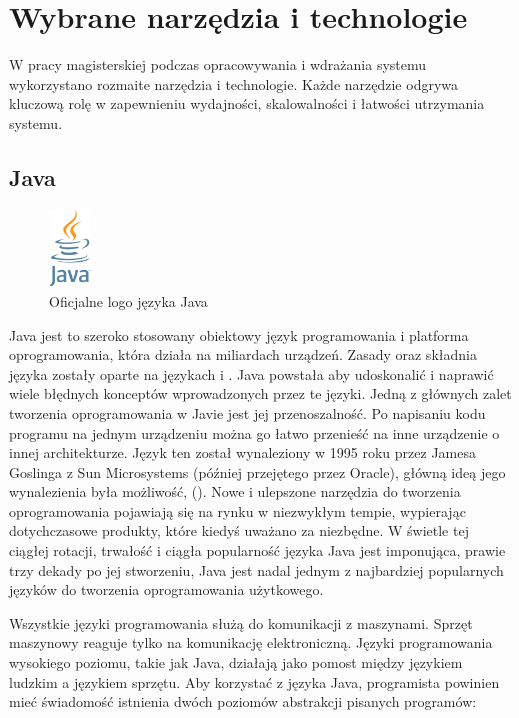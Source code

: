 \chapter{Wybrane narzędzia i technologie}


W pracy magisterskiej podczas opracowywania i wdrażania systemu wykorzystano rozmaite narzędzia i technologie. Każde narzędzie odgrywa kluczową rolę w zapewnieniu wydajności, skalowalności i łatwości utrzymania systemu.

\section{Java}

\begin{figure}[!htbp]
    \centering
    \includegraphics[width=0.1\textwidth]{images/javaLogo.png}
    \caption{Oficjalne logo języka Java}
    \label{fig:enter-label}
\end{figure}

Java jest to szeroko stosowany obiektowy język programowania i platforma oprogramowania, która działa na miliardach urządzeń. Zasady oraz składnia języka zostały oparte na językach  i \cite{javaIBM}\cite{cstandard}\cite{cppstandard}. Java powstała aby udoskonalić i naprawić wiele błędnych konceptów wprowadzonych przez te języki. Jedną z głównych zalet tworzenia oprogramowania w Javie jest jej przenoszalność. Po napisaniu kodu programu na jednym urządzeniu można go łatwo przenieść na inne urządzenie o innej architekturze. Język ten został wynaleziony w 1995 roku przez Jamesa Goslinga z Sun Microsystems (później przejętego przez Oracle), główną ideą jego wynalezienia była możliwość,   (). Nowe i ulepszone narzędzia do tworzenia oprogramowania pojawiają się na rynku w niezwykłym tempie, wypierając dotychczasowe produkty, które kiedyś uważano za niezbędne. W świetle tej ciągłej rotacji, trwałość i ciągła popularność języka Java jest imponująca, prawie trzy dekady po jej stworzeniu, Java jest nadal jednym z najbardziej popularnych języków do tworzenia oprogramowania użytkowego\cite{javaIBM}\cite{javaDEV}.

Wszystkie języki programowania służą do komunikacji z maszynami. Sprzęt maszynowy reaguje tylko na komunikację elektroniczną. Języki programowania wysokiego poziomu, takie jak Java, działają jako pomost między językiem ludzkim a językiem sprzętu. Aby korzystać z języka Java, programista powinien mieć świadomość istnienia dwóch poziomów abstrakcji pisanych programów: 

